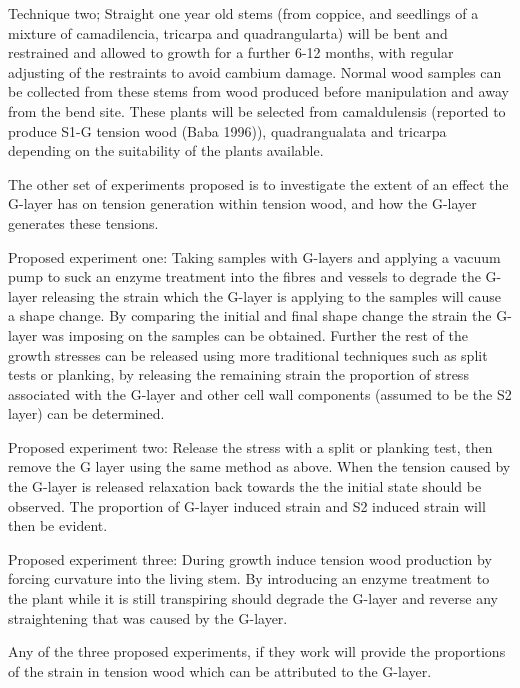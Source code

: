 \documentclass{article}
\begin{document}
Technique two; Straight one year old stems (from coppice, and seedlings of a
mixture of camadilencia, tricarpa and quadrangularta) will be bent and restrained and
allowed to growth for a further 6-12 months, with regular adjusting of the
restraints to avoid cambium damage. Normal wood samples can be collected from
these stems from wood produced before manipulation and away from the bend site.
These plants will be selected from camaldulensis (reported to produce S1-G
tension wood (Baba 1996)), quadrangualata and tricarpa depending on the
suitability of the plants available.

The other set of experiments proposed is to investigate the extent of an effect
the G-layer has on tension generation within tension wood, and how the G-layer
generates these tensions.

Proposed experiment one:
Taking samples with G-layers and applying a vacuum pump to suck an enzyme
treatment into the fibres and vessels to degrade the G-layer releasing the
strain which the G-layer is applying to the samples will cause a shape change.
By comparing the initial and final shape change the strain the G-layer was
imposing on the samples can be obtained. Further the rest of the growth stresses
can be released using more traditional techniques such as split tests or
planking, by releasing the remaining strain the proportion of stress associated
with the G-layer and other cell wall components (assumed to be the S2 layer) can
be determined.

Proposed experiment two:
Release the stress with a split or planking test, then remove the G
layer using the same method as above. When the tension caused by the G-layer is
released relaxation back towards the the initial state should be observed. The
proportion of G-layer induced strain and S2 induced strain will then be
evident.

Proposed experiment three:
During growth induce tension wood production by forcing curvature into the
living stem. By introducing an enzyme treatment to the plant while it is still
transpiring should degrade the G-layer and reverse any straightening that was
caused by the G-layer.

Any of the three proposed experiments, if they work will provide the proportions
of the strain in tension wood which can be attributed to the G-layer.

\end{document}
